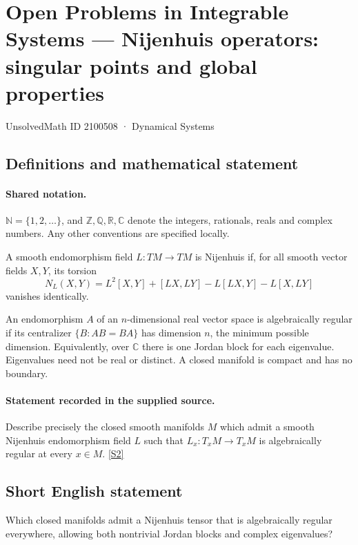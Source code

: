\documentclass[11pt]{article}
\newcommand{\sref}[2]{\hyperlink{source:#1:#2}{[S#2]}}
\begin{document}
\setcounter{section}{2100507}
\section{Open Problems in Integrable Systems — Nijenhuis operators: singular points and global properties}\label{2100508}
{\small\sffamily UnsolvedMath ID 2100508 · Dynamical Systems}
\subsection{Definitions and mathematical statement}

\paragraph{Shared notation.}$\mathbb N=\{1,2,\ldots\}$, and $\mathbb Z,\mathbb Q,\mathbb R,\mathbb C$ denote the integers, rationals, reals and complex numbers. Any other conventions are specified locally.


A smooth endomorphism field $L:TM\to TM$ is Nijenhuis if, for all smooth vector fields $X,Y$, its torsion
\[N_L(X,Y)=L^2[X,Y]+[LX,LY]-L[LX,Y]-L[X,LY]\]
vanishes identically.\par An endomorphism $A$ of an $n$-dimensional real vector space is algebraically regular if its centralizer $\{B:AB=BA\}$ has dimension $n$, the minimum possible dimension. Equivalently, over $\mathbb C$ there is one Jordan block for each eigenvalue. Eigenvalues need not be real or distinct. A closed manifold is compact and has no boundary.
\paragraph{Statement recorded in the supplied source.}
Describe precisely the closed smooth manifolds $M$ which admit a smooth Nijenhuis endomorphism field $L$ such that $L_x:T_xM\to T_xM$ is algebraically regular at every $x\in M$. \sref{2100508}{2}
\subsection{Short English statement}
Which closed manifolds admit a Nijenhuis tensor that is algebraically regular everywhere, allowing both nontrivial Jordan blocks and complex eigenvalues?
\end{document}

